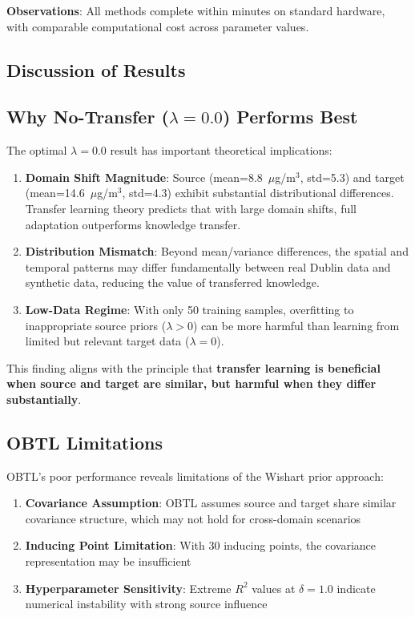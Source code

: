 \textbf{Observations}: All methods complete within minutes on standard hardware, with comparable computational cost across parameter values.

\subsection{Discussion of Results}
\label{sec:discussion}

\subsection{Why No-Transfer (\(\lambda=0.0\)) Performs Best}
\label{subsec:why_no_transfer}

The optimal \(\lambda=0.0\) result has important theoretical implications:

\begin{enumerate}
    \item \textbf{Domain Shift Magnitude}: Source (mean=8.8~\(\mu\)g/m\(^3\), std=5.3) and target (mean=14.6~\(\mu\)g/m\(^3\), std=4.3) exhibit substantial distributional differences. Transfer learning theory predicts that with large domain shifts, full adaptation outperforms knowledge transfer.

    \item \textbf{Distribution Mismatch}: Beyond mean/variance differences, the spatial and temporal patterns may differ fundamentally between real Dublin data and synthetic data, reducing the value of transferred knowledge.

    \item \textbf{Low-Data Regime}: With only 50 training samples, overfitting to inappropriate source priors (\(\lambda>0\)) can be more harmful than learning from limited but relevant target data (\(\lambda=0\)).
\end{enumerate}

This finding aligns with the principle that \textbf{transfer learning is beneficial when source and target are similar, but harmful when they differ substantially}.

\subsection{OBTL Limitations}
\label{subsec:obtl_limitations}

OBTL's poor performance reveals limitations of the Wishart prior approach:

\begin{enumerate}
    \item \textbf{Covariance Assumption}: OBTL assumes source and target share similar covariance structure, which may not hold for cross-domain scenarios
    \item \textbf{Inducing Point Limitation}: With 30 inducing points, the covariance representation may be insufficient
    \item \textbf{Hyperparameter Sensitivity}: Extreme \(R^2\) values at \(\delta=1.0\) indicate numerical instability with strong source influence
\end{enumerate}

